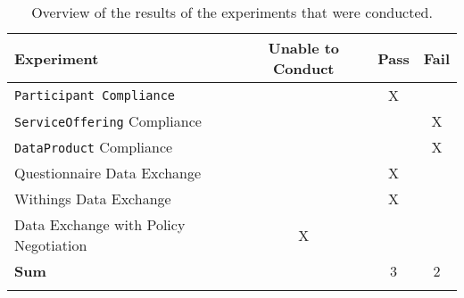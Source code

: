\begin{longtable}{ |l|c|c|c| }
	\hline
	\textbf{Experiment} & \textbf{Unable to Conduct} & \textbf{Pass} & \textbf{Fail}\\
	\hline
	\texttt{Participant Compliance} &&X&\\
	\hline
	\texttt{ServiceOffering} Compliance &&&X\\
	\hline
	\texttt{DataProduct} Compliance &&&X\\
	\hline
	Questionnaire Data Exchange &&X&\\
	\hline
	Withings Data Exchange &&X&\\
	\hline
	Data Exchange with Policy Negotiation &X&&\\
	\hline
	\textbf{Sum} &&3&2\\
	\hline
	\caption{Overview of the results of the experiments that were conducted.}
	\label{tab:results}
\end{longtable}
